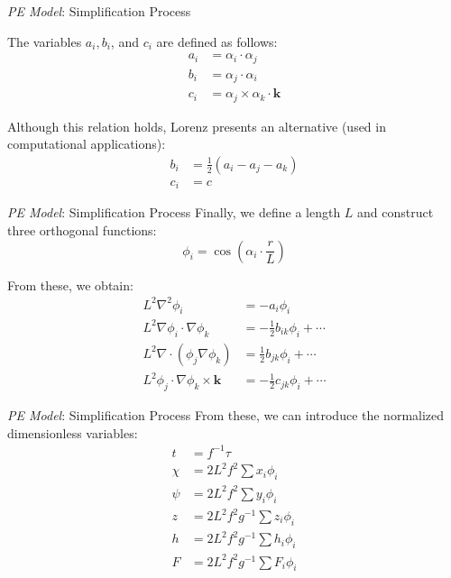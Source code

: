 \begin{frame}{\textit{PE Model}: Simplification Process}
	
	The variables $a_i, b_i$, and $c_i$ are defined as follows:
	\begin{align*}
		a_i & = \alpha_i \cdot \alpha_j                   \\
		b_i & = \alpha_j \cdot \alpha_i                   \\
		c_i & = \alpha_j \times \alpha_k \cdot \mathbf{k} 
	\end{align*}
	
	Although this relation holds, Lorenz presents an alternative (used in computational applications):
	\begin{align*}
		b_i & = \frac{1}{2}\left(a_i - a_j - a_k\right) \\
		c_i & = c                                       
	\end{align*}
\end{frame}


\begin{frame}{\textit{PE Model}: Simplification Process}
	Finally, we define a length $L$ and construct three orthogonal functions:
	\begin{equation*}
		\phi_i = \cos\left(\alpha_i \cdot \frac{r}{L}\right)
	\end{equation*}
	
	From these, we obtain:
	\small
	\begin{align*}
		L^2\nabla^2\phi_i                              & = -a_i\phi_i                        \\
		L^2\nabla\phi_i \cdot \nabla\phi_k             & = -\frac{1}{2}b_{ik}\phi_i + \cdots \\
		L^2\nabla \cdot (\phi_j\nabla\phi_k)           & = \frac{1}{2}b_{jk}\phi_i + \cdots  \\
		L^2\phi_j \cdot \nabla\phi_k \times \mathbf{k} & = -\frac{1}{2}c_{jk}\phi_i + \cdots 
	\end{align*}
\end{frame}


\begin{frame}{\textit{PE Model}: Simplification Process}
	From these, we can introduce the normalized dimensionless variables:
	\begin{align}
		t    & = f^{-1}\tau \label{eq:dimensionless-variables-start}                 \\
		\chi & = 2L^2f^2 \sum x_i\phi_i                                              \\
		\psi & = 2L^2f^2 \sum y_i\phi_i                                              \\
		z    & = 2L^2f^2g^{-1} \sum z_i\phi_i                                        \\
		h    & = 2L^2f^2g^{-1} \sum h_i\phi_i                                        \\
		F    & = 2L^2f^2g^{-1} \sum F_i\phi_i \label{eq:dimensionless-variables-end} 
	\end{align}
\end{frame}

